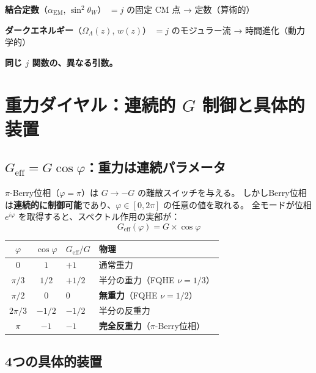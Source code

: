 \documentclass[11pt,a4paper]{article}
\begin{document}
\begin{tcolorbox}[colback=green!5,colframe=green!60!black,title=算術と動力学の分離]
\textbf{結合定数}（$\alpha_{\mathrm{EM}}$, $\sin^2\theta_W$）
$= j$ の固定 CM 点 → 定数（算術的）

\textbf{ダークエネルギー}（$\Omega_\Lambda(z)$, $w(z)$）
$= j$ のモジュラー流 → 時間進化（動力学的）

\textbf{同じ $j$ 関数の、異なる引数。}
\end{tcolorbox}

\section{重力ダイヤル：連続的 $G$ 制御と具体的装置}

\subsection{$G_{\mathrm{eff}} = G \cos\varphi$：重力は連続パラメータ}

$\pi$-Berry位相（$\varphi = \pi$）は $G \to -G$ の離散スイッチを与える。
しかしBerry位相は\textbf{連続的に制御可能}であり、$\varphi \in [0, 2\pi]$ の任意の値を取れる。
全モードが位相 $e^{i\varphi}$ を取得すると、スペクトル作用の実部が：
\begin{equation}
  G_{\mathrm{eff}}(\varphi) = G \times \cos\varphi
\end{equation}

\begin{center}
\begin{tabular}{ccll}
\toprule
$\varphi$ & $\cos\varphi$ & $G_{\mathrm{eff}}/G$ & 物理 \\
\midrule
$0$ & $1$ & $+1$ & 通常重力 \\
$\pi/3$ & $1/2$ & $+1/2$ & 半分の重力（FQHE $\nu=1/3$） \\
$\pi/2$ & $0$ & $0$ & \textbf{無重力}（FQHE $\nu=1/2$） \\
$2\pi/3$ & $-1/2$ & $-1/2$ & 半分の反重力 \\
$\pi$ & $-1$ & $-1$ & \textbf{完全反重力}（$\pi$-Berry位相） \\
\bottomrule
\end{tabular}
\end{center}

\subsection{4つの具体的装置}
\end{document}
